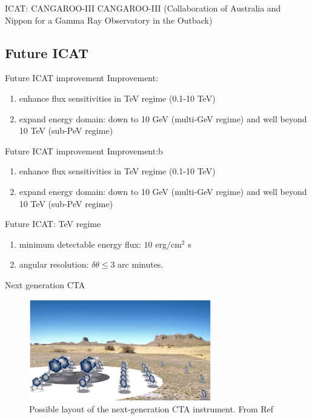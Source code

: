 \documentclass{beamer}
\begin{document}
\begin{frame}{ICAT: CANGAROO-III}
	CANGAROO-III (Collaboration of Australia and Nippon for a Gamma Ray Observatory in the Outback)
\end{frame}

\subsection{Future ICAT}
\begin{frame}{Future ICAT improvement}
	Improvement:
	\begin{enumerate}
		\item enhance flux sensitivities in TeV regime (0.1-10 TeV)
		\item expand energy domain: down to 10 GeV (multi-GeV regime) and well beyond 10 TeV (sub-PeV regime)
	\end{enumerate}
\end{frame}


\begin{frame}{Future ICAT improvement}
	Improvement:b
	\begin{enumerate}
		\item enhance flux sensitivities in TeV regime (0.1-10 TeV)
		\item expand energy domain: down to 10 GeV (multi-GeV regime) and well beyond 10 TeV (sub-PeV regime)

	\end{enumerate}
\end{frame}


\begin{frame}{Future ICAT: TeV regime}
	\begin{enumerate}
		\item minimum detectable energy flux: $10$ erg$/ \text{cm}^2 $ s
		\item angular resolution: $\delta \theta \leq 3$ arc minutes.
	\end{enumerate}
\end{frame}


\begin{frame}{Next generation CTA}
	\begin{figure}[h]
		\includegraphics[width=300px]{next-generationCTA.png}
		\caption{Possible layout of the next-generation CTA instrument.
		From Ref}
	\end{figure}
\end{frame}
\end{document}
